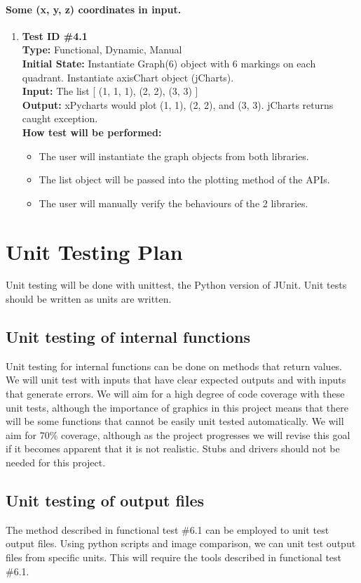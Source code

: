 \documentclass[12pt, titlepage]{article}
\begin{document}
	\paragraph{Some (x, y, z) coordinates in input.}
		\begin{enumerate}
			\item{\textbf{Test ID \#4.1\\}}
			\textbf{Type:} Functional, Dynamic, Manual\\
			\textbf{Initial State:} Instantiate Graph(6) object with 6 markings on each quadrant. Instantiate axisChart object (jCharts).\\	
			\textbf{Input:} The list [ (1, 1, 1), (2, 2), (3, 3) ] \\
			\textbf{Output:}    xPycharts would plot (1, 1), (2, 2), and (3, 3). jCharts returns caught exception.  \\
			\textbf{How test will be performed:}
				\begin{itemize}[label={--}]
					\item The user will instantiate the graph objects from both libraries. 
					\item The list object will be passed into the plotting method of the APIs.
					\item The user will manually verify the behaviours of the 2 libraries.
				\end{itemize}					
	\end{enumerate}

				
\section{Unit Testing Plan}
Unit testing will be done with unittest, the Python version of JUnit. Unit tests should be written as units are written.
\subsection{Unit testing of internal functions}
Unit testing for internal functions can be done on methods that return values. We will unit test with inputs that have clear expected outputs and with inputs that generate errors. We will aim for a high degree of code coverage with these unit tests, although the importance of graphics in this project means that there will be some functions that cannot be easily unit tested automatically. We will aim for 70\% coverage, although as the project progresses we will revise this goal if it becomes apparent that it is not realistic. Stubs and drivers should not be needed for this project.
		
\subsection{Unit testing of output files}	
The method described in functional test \#6.1 can be employed to unit test output files. Using python scripts and image comparison, we can unit test output files from specific units. This will require the tools described in functional test \#6.1.
\end{document}
